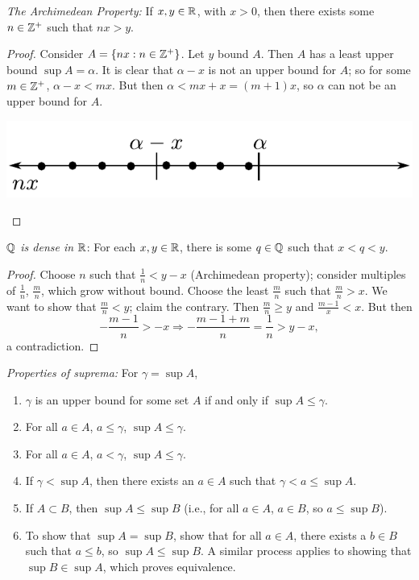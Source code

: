\begin{theorem}
	\emph{The Archimedean Property:} If $x,y \in \mathbb{R}$, with $x>0$, then there exists some $n\in\mathbb{Z}^+$ such that $nx>y$.
\end{theorem}
\begin{proof}
	Consider $A=\{nx:n\in\mathbb{Z}^+\}$. Let $y$ bound $A$. Then $A$ has a least upper bound $\sup A=\alpha$. It is clear that $\alpha - x$ is not an upper bound for $A$; so for some $m\in \mathbb{Z}^+$, $\alpha-x<mx$. But then $\alpha<mx+x=(m+1)x$, so $\alpha$ can not be an upper bound for $A$.
    \begin{center}
        
    \includegraphics[width=.75\linewidth]{figures/archimideanpropertyproof.pdf}

     \end{center}
\end{proof}

\begin{theorem}
	\emph{$\mathbb{Q}$ is dense in $\mathbb{R}$}: For each $x,y\in\mathbb{R}$, there is some $q\in\mathbb{Q}$ such that $x<q<y$.
\end{theorem}
\begin{proof}
	Choose $n$ such that $\frac{1}{n}<y-x$ (Archimedean property); consider multiples of $ \frac{1}{n}$, $\frac{m}{n}$, which grow without bound. Choose the least $\frac{m}{n}$ such that $\frac{m}{n}>x$. We want to show that $\frac{m}{n}<y$; claim the contrary. Then $\frac{m}{n}\geq y$ and $\frac{m-1}{x}<x$. But then $$-\frac{m-1}{n}>-x \Rightarrow -\frac{m-1+m}{n}=\frac{1}{n}>y-x,$$ a contradiction.
\end{proof}

\begin{theorem}
	\emph{Properties of suprema:} For $\gamma = \sup A$,
    \begin{enumerate}
	    \item $\gamma$ is an upper bound for some set $A$ if and only if $\sup A \leq \gamma$. 
        \item For all $a \in A$, $a \leq \gamma$, $\sup A \leq \gamma$.
        \item For all $a \in A$, $a < \gamma$, $\sup A \leq \gamma$.
        \item If $\gamma < \sup A$, then there exists an $a\in A$ such that $\gamma < a \leq \sup A$.
        \item If $A\subset B$, then $\sup A \leq \sup B$ (i.e., for all $a\in A$, $a\in B$, so $a \leq \sup B$). 
        \item To show that $\sup A = \sup B$, show that for all $a \in A$, there exists a $b\in B$ such that $a \leq b $, so $\sup A \leq \sup B$. A similar process applies to showing that $\sup B \in \sup A$, which proves equivalence.
	\end{enumerate}
\end{theorem}